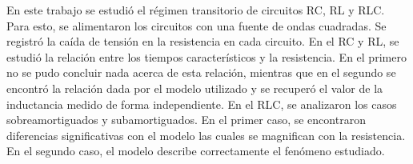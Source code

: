 En este trabajo se estudió el régimen transitorio de circuitos RC, RL y RLC. Para esto, se alimentaron los circuitos con una fuente de ondas cuadradas. Se registró la caída de tensión en la resistencia en cada circuito. En el RC y RL, se estudió la relación entre los tiempos característicos y la resistencia. En el primero no se pudo concluir nada acerca de esta relación, mientras que en el segundo se encontró la relación dada por el modelo utilizado y se recuperó el valor de la inductancia medido de forma independiente. En el RLC, se analizaron los casos sobreamortiguados y subamortiguados. En el primer caso, se encontraron diferencias significativas con el modelo las cuales se magnifican con la resistencia. En el segundo caso, el modelo describe correctamente el fenómeno estudiado.